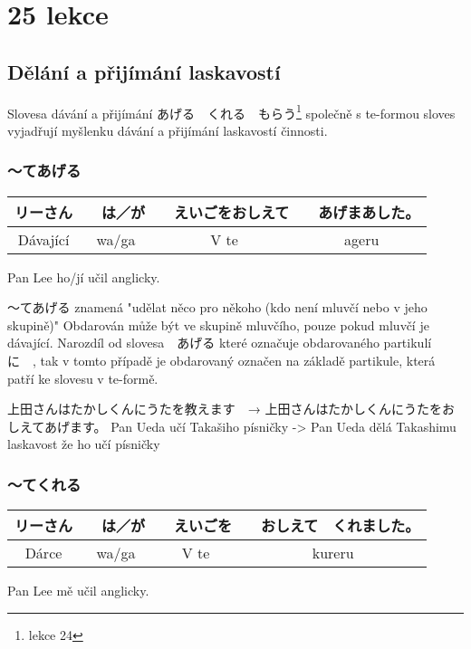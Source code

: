 \section{25 lekce}
\label{sec:lekce_25}

\subsection{Dělání a přijímání laskavostí}
Slovesa dávání a přijímání あげる　くれる　もらう\footnote{lekce 24} společně s te-formou sloves vyjadřují myšlenku dávání a přijímání laskavostí činnosti. 

\subsubsection{〜てあげる}
\begin{center}
\begin{tabular}{||c|c||c|c||}
\hline
リーさん&　は／が&　えいごをおしえて&　あげまあした。\\
\hline
Dávající&wa/ga&V te&ageru\\
\hline
\end{tabular}
\end{center}
Pan Lee ho/jí učil anglicky.

〜てあげる znamená "udělat něco pro někoho (kdo není mluvčí nebo v jeho skupině)" Obdarován může být ve skupině mluvčího, pouze pokud mluvčí je dávající. Narozdíl od slovesa　あげる které označuje obdarovaného partikulí　に　, tak v tomto případě je obdarovaný označen na základě partikule, která patří ke slovesu v te-formě.

上田さんはたかしくんにうたを教えます　→ 上田さんはたかしくんにうたをおしえてあげます。
Pan Ueda učí Takašiho písničky 	->	Pan Ueda dělá Takashimu laskavost že ho učí písničky



\subsubsection{〜てくれる}
\begin{center}
\begin{tabular}{||c|c||c|c||}
\hline
リーさん&　は／が &　えいごを&　おしえて　くれました。\\
\hline
Dárce &wa/ga&V te&kureru\\
\hline
\end{tabular}
\end{center}
Pan Lee mě učil anglicky.

